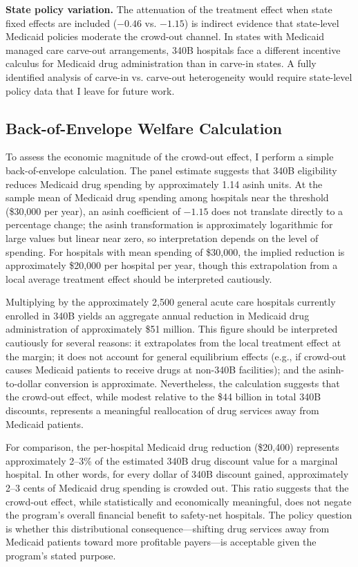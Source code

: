 \documentclass[12pt]{article}
\begin{document}
\textbf{State policy variation.} The attenuation of the treatment effect when state fixed effects are included ($-0.46$ vs. $-1.15$) is indirect evidence that state-level Medicaid policies moderate the crowd-out channel. In states with Medicaid managed care carve-out arrangements, 340B hospitals face a different incentive calculus for Medicaid drug administration than in carve-in states. A fully identified analysis of carve-in vs. carve-out heterogeneity would require state-level policy data that I leave for future work.

\subsection{Back-of-Envelope Welfare Calculation}

To assess the economic magnitude of the crowd-out effect, I perform a simple back-of-envelope calculation. The panel estimate suggests that 340B eligibility reduces Medicaid drug spending by approximately 1.14 asinh units. At the sample mean of Medicaid drug spending among hospitals near the threshold (\$30,000 per year), an asinh coefficient of $-1.15$ does not translate directly to a percentage change; the asinh transformation is approximately logarithmic for large values but linear near zero, so interpretation depends on the level of spending. For hospitals with mean spending of \$30,000, the implied reduction is approximately \$20,000 per hospital per year, though this extrapolation from a local average treatment effect should be interpreted cautiously.

Multiplying by the approximately 2,500 general acute care hospitals currently enrolled in 340B yields an aggregate annual reduction in Medicaid drug administration of approximately \$51 million. This figure should be interpreted cautiously for several reasons: it extrapolates from the local treatment effect at the margin; it does not account for general equilibrium effects (e.g., if crowd-out causes Medicaid patients to receive drugs at non-340B facilities); and the asinh-to-dollar conversion is approximate. Nevertheless, the calculation suggests that the crowd-out effect, while modest relative to the \$44 billion in total 340B discounts, represents a meaningful reallocation of drug services away from Medicaid patients.

For comparison, the per-hospital Medicaid drug reduction (\$20,400) represents approximately 2--3\% of the estimated 340B drug discount value for a marginal hospital. In other words, for every dollar of 340B discount gained, approximately 2--3 cents of Medicaid drug spending is crowded out. This ratio suggests that the crowd-out effect, while statistically and economically meaningful, does not negate the program's overall financial benefit to safety-net hospitals. The policy question is whether this distributional consequence---shifting drug services away from Medicaid patients toward more profitable payers---is acceptable given the program's stated purpose.
\end{document}
